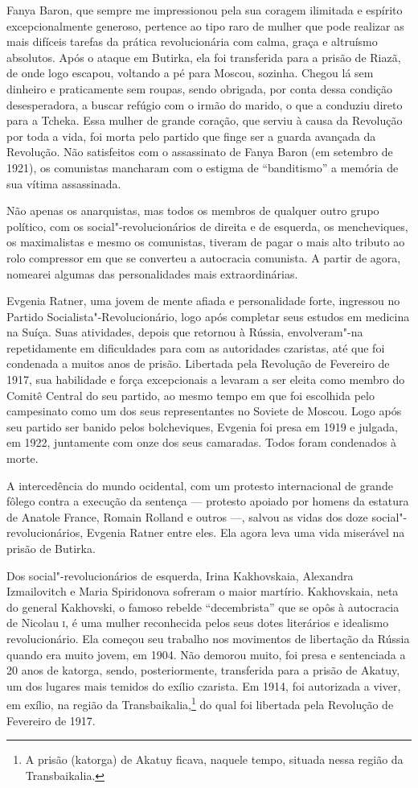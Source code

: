 Fanya Baron, que sempre me impressionou pela sua coragem ilimitada e
espírito excepcionalmente generoso, pertence ao tipo raro de mulher que
pode realizar as mais difíceis tarefas da prática revolucionária com
calma, graça e altruísmo absolutos. Após o ataque em Butirka, ela foi
transferida para a prisão de Riazã, de onde logo escapou, voltando a pé
para Moscou, sozinha. Chegou lá sem dinheiro e praticamente
sem roupas, sendo obrigada, por conta dessa condição desesperadora, a
buscar refúgio com o irmão do marido, o que a conduziu direto para a Tcheka.
Essa mulher de grande coração, que serviu à causa da Revolução por toda
a vida, foi morta pelo partido que finge ser a guarda avançada da
Revolução. Não satisfeitos com o assassinato de Fanya Baron (em setembro
de 1921), os comunistas mancharam com o estigma de ``banditismo'' a
memória de sua vítima assassinada.

Não apenas os anarquistas, mas todos os membros de qualquer outro grupo
político, com os social"-revolucionários de direita e de esquerda, os
mencheviques, os maximalistas e mesmo os comunistas, tiveram de pagar
o mais alto tributo ao rolo compressor em que se converteu a autocracia comunista. A partir de agora, nomearei algumas das personalidades mais extraordinárias.

Evgenia Ratner, uma jovem de mente afiada e personalidade forte,
ingressou no Partido Socialista"-Revolucionário, logo após completar seus
estudos em medicina na Suíça. Suas atividades, depois que retornou à
Rússia, envolveram"-na repetidamente em dificuldades para com as
autoridades czaristas, até que foi condenada a muitos anos de prisão.
Libertada pela Revolução de Fevereiro de 1917, sua habilidade e força
excepcionais a levaram a ser eleita como membro do Comitê Central do seu
partido, ao mesmo tempo em que foi escolhida pelo campesinato como
um dos seus representantes no Soviete de Moscou. Logo após seu partido
ser banido pelos bolcheviques, Evgenia foi presa em 1919 e julgada, em
1922, juntamente com onze dos seus camaradas. Todos foram condenados à morte.

A intercedência do mundo ocidental, com um protesto internacional de
grande fôlego contra a execução da sentença --- protesto apoiado por homens da estatura de
Anatole France, Romain Rolland e outros ---, salvou as vidas dos doze
social"-revolucionários, Evgenia Ratner entre eles. Ela agora leva uma
vida miserável na prisão de Butirka.

Dos social"-revolucionários de esquerda, Irina Kakhovskaia,
Alexandra Izmailovitch e Maria Spiridonova sofreram o maior martírio.
Kakhovskaia, neta do general Kakhovski, o famoso rebelde ``decembrista''
que se opôs à autocracia de Nicolau \textsc{i}, é uma mulher reconhecida pelos
seus dotes literários e idealismo revolucionário. Ela começou seu
trabalho nos movimentos de libertação da Rússia quando era muito jovem,
em 1904. Não demorou muito, foi presa e sentenciada a 20 anos de
katorga, sendo, posteriormente, transferida para a prisão de Akatuy, um dos lugares
mais temidos do exílio czarista. Em 1914, foi autorizada a viver, em
exílio, na região da Transbaikalia,\footnote{A prisão (katorga) de Akatuy ficava, naquele tempo, situada nessa região da Transbaikalia.} do qual foi libertada pela Revolução
de Fevereiro de 1917.

